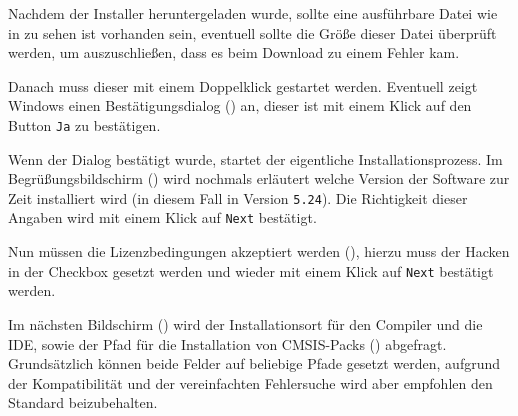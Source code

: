 
Nachdem der Installer heruntergeladen wurde, sollte eine ausführbare Datei  wie in  zu sehen ist vorhanden sein, eventuell sollte die Größe dieser Datei überprüft werden, um auszuschließen, dass es beim Download zu einem Fehler kam.


Danach muss dieser mit einem Doppelklick gestartet werden. Eventuell zeigt Windows einen Bestätigungsdialog () an, dieser ist mit einem Klick auf den Button \texttt{Ja} zu bestätigen.


Wenn der Dialog bestätigt wurde, startet der eigentliche Installationsprozess. Im Begrüßungsbildschirm () wird nochmals erläutert welche Version der Software zur Zeit installiert wird (in diesem Fall \uVision{} in Version \texttt{5.24}). Die Richtigkeit dieser Angaben wird mit einem Klick auf \texttt{Next} bestätigt.


Nun müssen die Lizenzbedingungen akzeptiert werden (), hierzu muss der Hacken in der Checkbox gesetzt werden und wieder mit einem Klick auf \texttt{Next} bestätigt werden.


Im nächsten Bildschirm () wird der Installationsort für den Compiler und die IDE, sowie der Pfad für die Installation von \gls{CMSIS}-Packs () abgefragt. Grundsätzlich können beide Felder auf beliebige Pfade gesetzt werden, aufgrund der Kompatibilität und der vereinfachten Fehlersuche wird aber empfohlen den Standard beizubehalten.


